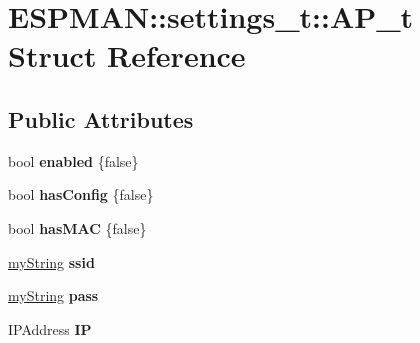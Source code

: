 \hypertarget{struct_e_s_p_m_a_n_1_1settings__t_1_1_a_p__t}{}\section{E\+S\+P\+M\+AN\+:\+:settings\+\_\+t\+:\+:A\+P\+\_\+t Struct Reference}
\label{struct_e_s_p_m_a_n_1_1settings__t_1_1_a_p__t}
\subsection*{Public Attributes}
\begin{DoxyCompactItemize}
\item 
\mbox{\label{struct_e_s_p_m_a_n_1_1settings__t_1_1_a_p__t_af33864067824cd2b70b570d978b3f839}} 
bool {\bfseries enabled} \{false\}
\item 
\mbox{\label{struct_e_s_p_m_a_n_1_1settings__t_1_1_a_p__t_a4abf044830a12f4caeb89fadd484af9a}} 
bool {\bfseries has\+Config} \{false\}
\item 
\mbox{\label{struct_e_s_p_m_a_n_1_1settings__t_1_1_a_p__t_ab8d0cfa8c4f57cacad796779b3f84ff0}} 
bool {\bfseries has\+M\+AC} \{false\}
\item 
\mbox{\label{struct_e_s_p_m_a_n_1_1settings__t_1_1_a_p__t_a207de9b69255b23b0963e91d5cd73098}} 
\hyperlink{class_e_s_p_m_a_n_1_1my_string}{my\+String} {\bfseries ssid}
\item 
\mbox{\label{struct_e_s_p_m_a_n_1_1settings__t_1_1_a_p__t_a4f8c96737f9aa05c61324eed261ef133}} 
\hyperlink{class_e_s_p_m_a_n_1_1my_string}{my\+String} {\bfseries pass}
\item 
\mbox{\label{struct_e_s_p_m_a_n_1_1settings__t_1_1_a_p__t_a5889ccecc4c8bafa7c2f85ce533c95e3}} 
I\+P\+Address {\bfseries IP}
\item 
\mbox{\label{struct_e_s_p_m_a_n_1_1settings__t_1_1_a_p__t_a476475a40c3c67af6a67e374b09f7778}} 

\end{DoxyCompactItemize}
